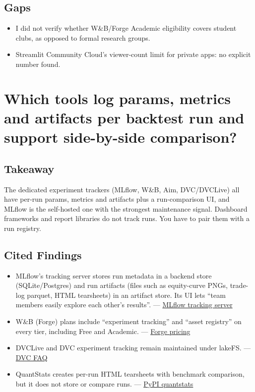 \documentclass{article}
\begin{document}
\subsection{Gaps}

\begin{itemize}

\item I did not verify whether W\&B/\allowbreak{}Forge Academic eligibility covers student clubs, as opposed to formal research groups.

\item Streamlit Community Cloud's viewer-count limit for private apps: no explicit number found.

\end{itemize}

\section{Which tools log params, metrics and artifacts per backtest run and support side-by-side comparison?}

\subsection{Takeaway}

The dedicated experiment trackers (MLflow, W\&B, Aim, DVC/\allowbreak{}DVCLive) all have per-run params, metrics and artifacts plus a run-comparison UI, and MLflow is the self-hosted one with the strongest maintenance signal. Dashboard frameworks and report libraries do not track runs. You have to pair them with a run registry.

\subsection{Cited Findings}

\begin{itemize}

\item MLflow's tracking server stores run metadata in a backend store (SQLite/\allowbreak{}Postgres) and run artifacts (files such as equity-curve PNGs, trade-log parquet, HTML tearsheets) in an artifact store. Its UI lets ``team members easily explore each other's results''. --- \href{https://mlflow.org/docs/latest/self-hosting/architecture/tracking-server/}{MLflow tracking server}

\item W\&B (Forge) plans include ``experiment tracking'' and ``asset registry'' on every tier, including Free and Academic. --- \href{https://coreweave.com/forge-pricing}{Forge pricing}

\item DVCLive and DVC experiment tracking remain maintained under lakeFS. --- \href{https://dvc.org/blog/dvc-joins-lakefs-your-questions-answered/}{DVC FAQ}

\item QuantStats creates per-run HTML tearsheets with benchmark comparison, but it does not store or compare runs. --- \href{https://pypi.org/project/quantstats/}{PyPI quantstats}

\end{itemize}
\end{document}
